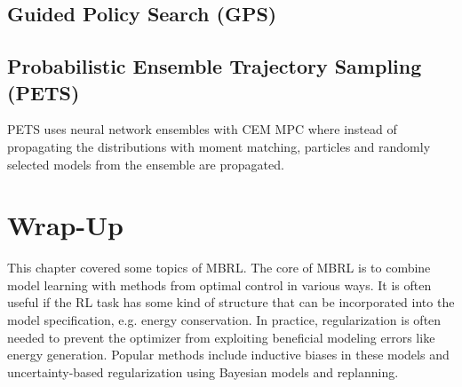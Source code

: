 		\subsection{Guided Policy Search (GPS)} %
			\label{subsec:gps}


		\subsection{Probabilistic Ensemble Trajectory Sampling (PETS)}
			PETS uses neural network ensembles with CEM MPC where instead of propagating the distributions with moment matching, particles and randomly selected models from the ensemble are propagated.

	\section{Wrap-Up}
		This chapter covered some topics of MBRL. The core of MBRL is to combine model learning with methods from optimal control in various ways. It is often useful if the RL task has some kind of structure that can be incorporated into the model specification, e.g. energy conservation. In practice, regularization is often needed to prevent the optimizer from exploiting beneficial modeling errors like energy generation. Popular methods include inductive biases in these models and uncertainty-based regularization using Bayesian models and replanning.


